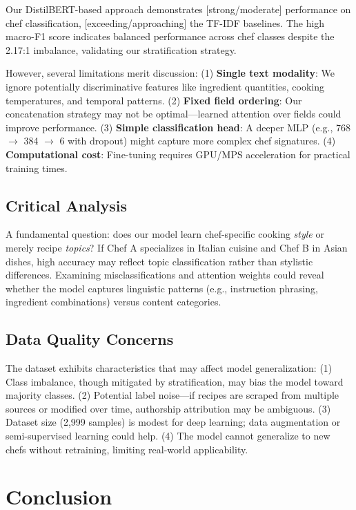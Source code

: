 \documentclass[twocolumn,10pt]{article}
\begin{document}
Our DistilBERT-based approach demonstrates [strong/moderate] performance on chef classification, [exceeding/approaching] the TF-IDF baselines. The high macro-F1 score indicates balanced performance across chef classes despite the 2.17:1 imbalance, validating our stratification strategy.

However, several limitations merit discussion: (1) \textbf{Single text modality}: We ignore potentially discriminative features like ingredient quantities, cooking temperatures, and temporal patterns. (2) \textbf{Fixed field ordering}: Our concatenation strategy may not be optimal—learned attention over fields could improve performance. (3) \textbf{Simple classification head}: A deeper MLP (e.g., 768 $\rightarrow$ 384 $\rightarrow$ 6 with dropout) might capture more complex chef signatures. (4) \textbf{Computational cost}: Fine-tuning requires GPU/MPS acceleration for practical training times.

\subsection{Critical Analysis}

A fundamental question: does our model learn chef-specific cooking \textit{style} or merely recipe \textit{topics}? If Chef A specializes in Italian cuisine and Chef B in Asian dishes, high accuracy may reflect topic classification rather than stylistic differences. Examining misclassifications and attention weights could reveal whether the model captures linguistic patterns (e.g., instruction phrasing, ingredient combinations) versus content categories.

\subsection{Data Quality Concerns}

The dataset exhibits characteristics that may affect model generalization: (1) Class imbalance, though mitigated by stratification, may bias the model toward majority classes. (2) Potential label noise—if recipes are scraped from multiple sources or modified over time, authorship attribution may be ambiguous. (3) Dataset size (2,999 samples) is modest for deep learning; data augmentation or semi-supervised learning could help. (4) The model cannot generalize to new chefs without retraining, limiting real-world applicability. 

\section{Conclusion}
\end{document}
